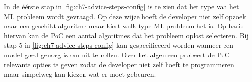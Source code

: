 In de éérste stap in \autoref{fig:ch7-advice-steps-config} is te zien dat het type van het ML probleem wordt gevraagd. Op deze wijze hoeft de developer niet zelf opzoek naar een geschikt algoritme maar kiest welk type ML probleem het is. Op basis hiervan kan de PoC een aantal algoritmes dat het probleem oplost selecteren. Bij stap 5 in \autoref{fig:ch7-advice-steps-config} kan gespecificeerd worden wanneer een model goed genoeg is om uit te rollen. Over het algemeen probeert de PoC relevante opties te geven zodat de developer niet zelf hoeft te programmeren maar simpelweg kan kiezen wat er moet gebeuren.